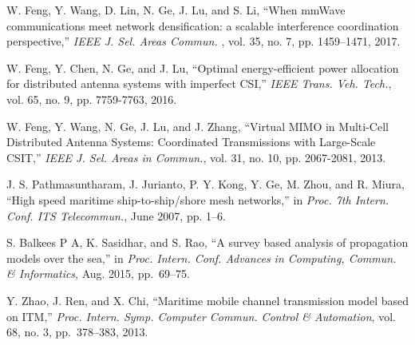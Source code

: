 \documentclass[conference]{IEEEtran}
\begin{document}
\begin{thebibliography}{10}
  W. Feng, Y. Wang, D. Lin, N. Ge, J. Lu, and S. Li, ``When mmWave communications meet network densification: a scalable interference coordination perspective,''
  \emph{IEEE J. Sel. Areas Commun. }, vol. 35, no. 7, pp. 1459--1471, 2017.
 
  W. Feng, Y. Chen, N. Ge, and J. Lu, ``Optimal energy-efficient power allocation for distributed antenna systems with imperfect CSI,''
  \emph{IEEE Trans. Veh. Tech.}, vol. 65, no. 9, pp. 7759-7763, 2016.
 
  W. Feng, Y. Wang, N. Ge, J. Lu, and J. Zhang, ``Virtual MIMO in Multi-Cell Distributed Antenna Systems: Coordinated Transmissions with Large-Scale CSIT,'' 
  \emph{IEEE J. Sel. Areas in Commun.}, vol. 31, no. 10, pp. 2067-2081, 2013.
 
 
  J. S. Pathmasuntharam, J. Jurianto, P. Y. Kong, Y. Ge, M. Zhou, and R. Miura, ``High speed maritime ship-to-ship/shore mesh networks,'' in
  \emph{Proc. 7th Intern. Conf. ITS Telecommun.}, June 2007, pp. 1--6.
 
 
 
 
  
 
 
 S. Balkees P A, K. Sasidhar, and S. Rao, ``A survey based analysis of propagation models over the sea,'' in
 \emph{Proc. Intern. Conf. Advances in Computing, Commun. \& Informatics}, Aug. 2015, pp.~69--75.
 
 Y. Zhao, J. Ren, and X. Chi, ``Maritime mobile channel transmission model based on ITM,''
 \emph{Proc. Intern. Symp. Computer Commun. Control \& Automation}, vol. 68, no. 3, pp.~378--383, 2013.
 

\end{thebibliography}
\end{document}
